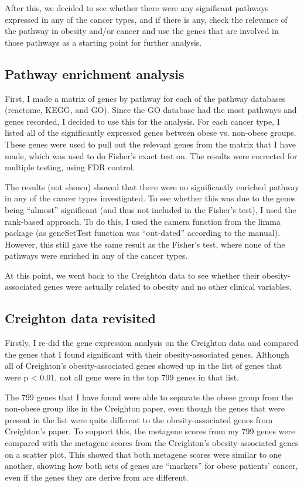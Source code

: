 \documentclass[a4paper, 11pt]{article}
\begin{document}
After this, we decided to see whether there were any significant pathways expressed in any of the cancer types, and if there is any, check the relevance of the pathway in obesity and/or cancer and use the genes that are involved in those pathways as a starting point for further analysis.

\subsection*{Pathway enrichment analysis}

First, I made a matrix of genes by pathway for each of the pathway databases (reactome, KEGG, and GO).
Since the GO database had the most pathways and genes recorded, I decided to use this for the analysis.
For each cancer type, I listed all of the significantly expressed genes between obese vs. non-obese groups.
These genes were used to pull out the relevant genes from the matrix that I have made, which was used to do Fisher's exact test on.
The results were corrected for multiple testing, using FDR control.

The results (not shown) showed that there were  no significantly enriched pathway in any of the cancer types investigated.
To see whether this was due to the genes being ``almost'' significant (and thus not included in the Fisher's test), I used the rank-based approach.
To do this, I used the camera function from the limma package (as geneSetTest function was ``out-dated'' according to the manual).
However, this still gave the same result as the Fisher's test, where none of the pathways were enriched in any of the cancer types.

At this point, we went back to the Creighton data to see whether their obesity-associated genes were actually related to obesity and no other clinical variables.

\subsection*{Creighton data revisited}

Firstly, I re-did the gene expression analysis on the Creighton data and compared the genes that I found significant with their obesity-associated genes.
Although all of Creighton's obesity-associated genes showed up in the list of genes that were p \textless{} 0.01, not all gene were in the top 799 genes in that list.

The 799 genes that I have found were able to separate the obese group from the non-obese group like in the Creighton paper, even though the genes that were present in the list were quite different to the obesity-associated genes from Creighton's paper.
To support this, the metagene scores from my 799 genes were compared with the metagene scores from the Creighton's obesity-associated genes on a scatter plot.
This showed that both metagene scores were similar to one another, showing how both sets of genes are ``markers'' for obese patients' cancer, even if the genes they are derive from are different.
\end{document}
